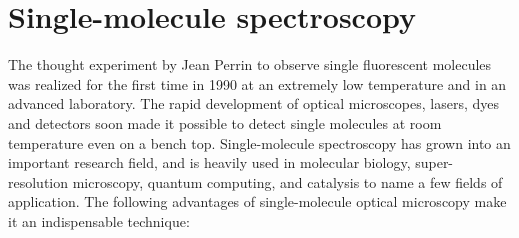 \section{Single-molecule spectroscopy}
The thought experiment by Jean Perrin to observe single fluorescent molecules was realized for the first time in 1990 at an extremely low temperature and in an advanced laboratory.\cite{orrit1990single}
The rapid development of optical microscopes, lasers, dyes and detectors soon made it possible to detect single molecules at room temperature even on a bench top.\cite{xie1998optical,weiss1999fluorescence,moerner1999illuminating}
Single-molecule spectroscopy has grown into an important research field, and is heavily used in molecular biology, super-resolution microscopy, quantum computing, and catalysis to name a few fields of application.\cite{zhuang2000a,huang2008threedimensional,eisaman2011invited,lounis2005singlephoton,roeffaers2007singlemolecule}
The following advantages of single-molecule optical microscopy make it an indispensable technique:
